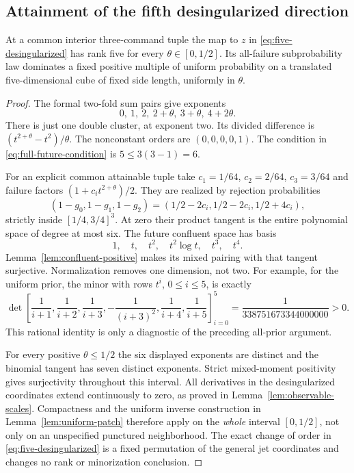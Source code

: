 \subsection{Attainment of the fifth desingularized direction}
\begin{lemma}\label{lem:five-patch}
At a common interior three-command tuple the map to $z$ in
\eqref{eq:five-desingularized} has rank five for every $\theta\in[0,1/2]$.
Its all-failure subprobability law dominates a fixed positive multiple of
uniform probability on a translated five-dimensional cube of fixed side
length, uniformly in $\theta$.
\end{lemma}
\begin{proof}
The formal two-fold sum pairs give exponents
\[
 0,\ 1,\ 2,\ 2+\theta,\ 3+\theta,\ 4+2\theta.
\]
There is just one double cluster, at exponent two. Its divided difference
is $(t^{2+\theta}-t^2)/\theta$. The nonconstant orders are
$(0,0,0,0,1)$. The condition in \eqref{eq:full-future-condition} is
$5\le3(3-1)=6$.

For an explicit common attainable tuple take
$c_1=1/64$, $c_2=2/64$, $c_3=3/64$ and failure factors
$(1+c_it^{2+\theta})/2$. They are realized by rejection probabilities
\[
 (1-g_0,1-g_1,1-g_2)
       =(1/2-2c_i,1/2-2c_i,1/2+4c_i),
\]
strictly inside $[1/4,3/4]^3$. At zero their product tangent is the
entire polynomial space of degree at most six. The future confluent
space has basis
\[
 1,\quad t,\quad t^2,\quad t^2\log t,\quad t^3,\quad t^4.
\]
Lemma~\ref{lem:confluent-positive} makes its mixed pairing with that
tangent surjective. Normalization removes one dimension, not two.
For example, for the uniform prior, the minor with rows $t^i$,
$0\le i\le5$, is exactly
\begin{equation}\label{eq:confluent-exact-minor}
 \det\left[
 \frac1{i+1},\frac1{i+2},\frac1{i+3},
 -\frac1{(i+3)^2},\frac1{i+4},\frac1{i+5}
       \right]_{i=0}^{5}
       =\frac1{338751673344000000}>0.
\end{equation}
This rational identity is only a diagnostic of the preceding all-prior
argument.

For every positive $\theta\le1/2$ the six displayed exponents are distinct
and the binomial tangent has seven distinct exponents. Strict mixed-moment
positivity gives surjectivity throughout this interval. All derivatives
in the desingularized coordinates extend continuously to zero, as proved
in Lemma~\ref{lem:observable-scales}. Compactness and the uniform inverse
construction in Lemma~\ref{lem:uniform-patch} therefore apply on the
\emph{whole} interval $[0,1/2]$, not only on an unspecified punctured
neighborhood. The exact change of order in \eqref{eq:five-desingularized}
is a fixed permutation of the general jet coordinates and changes no
rank or minorization conclusion.
\end{proof}

